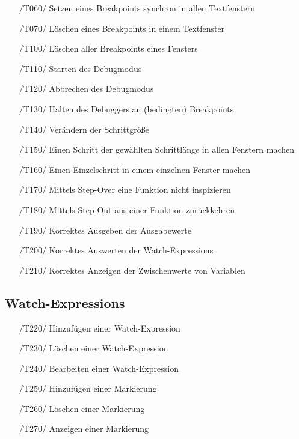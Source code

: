\documentclass[parskip=full]{scrartcl}
\begin{document}
\begin{itemize}

	\item[/T060/] Setzen eines \glspl{Breakpoint} synchron in allen Textfenstern
	\item[/T070/] Löschen eines \glspl{Breakpoint} in einem Textfenster
	\item[/T100/] Löschen aller \glspl{Breakpoint} eines Fensters
	\item[/T110/] Starten des \gls{Debugmodus}
	\item[/T120/] Abbrechen des \gls{Debugmodus}
	\item[/T130/] Halten des Debuggers an (bedingten) \glspl{Breakpoint}
	\item[/T140/] Verändern der Schrittgröße
	\item[/T150/] Einen \gls{Schritt} der gewählten Schrittlänge in allen Fenstern machen
	\item[/T160/] Einen \gls{Einzelschritt} in einem einzelnen Fenster machen
	\item[/T170/] Mittels \gls{Step-Over} eine Funktion nicht inspizieren
	\item[/T180/] Mittels \gls{Step-Out} aus einer Funktion zurückkehren
	\item[/T190/] Korrektes Ausgeben der Ausgabewerte
	\item[/T200/] Korrektes Auswerten der \glspl{Watch-Expression}
	\item[/T210/] Korrektes Anzeigen der Zwischenwerte von Variablen
	
\end{itemize}


\subsection{Watch-Expressions}

\begin{itemize}

	\item[/T220/] Hinzufügen einer \gls{Watch-Expression}
	\item[/T230/] Löschen einer \gls{Watch-Expression}
	\item[/T240/] Bearbeiten einer \gls{Watch-Expression}
	\item[/T250/] Hinzufügen einer Markierung
	\item[/T260/] Löschen einer Markierung
	\item[/T270/] Anzeigen einer Markierung
		
\end{itemize}
\end{document}
